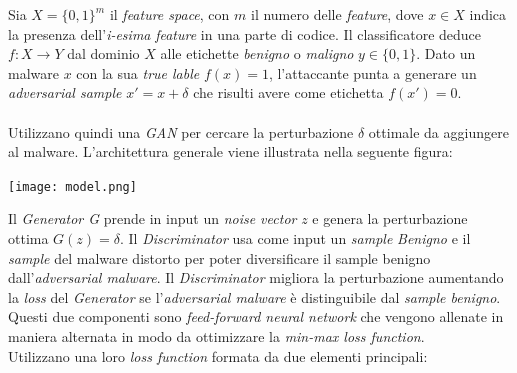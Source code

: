 Sia \(X = \{0, 1\}^m\) il \textit{feature space}, con \(m\) il numero delle \textit{feature}, dove \(x \in X\) indica la presenza dell'\textit{i-esima} \textit{feature} in una parte di codice. Il classificatore deduce \(f : X \to Y\) dal dominio \(X\) alle etichette \textit{benigno} o \textit{maligno} \(y \in \{0, 1\}\). Dato un malware \(x\) con la sua \textit{true lable} \(f(x) = 1\), l'attaccante punta a generare un \textit{adversarial sample} \(x' = x + \delta\) che risulti avere come etichetta \(f(x') = 0\).\\
\\
Utilizzano quindi una \textit{GAN} per cercare la perturbazione \(\delta\) ottimale da aggiungere al malware. L'architettura generale viene illustrata nella seguente figura:

\texttt{[image: model.png]}

Il \textit{Generator G} prende in input un \textit{noise vector} \(z\) e genera la perturbazione ottima \(G(z) = \delta\).
Il \textit{Discriminator} usa come input un \textit{sample} \textit{Benigno} e il \textit{sample} del malware distorto per poter diversificare il sample benigno dall'\textit{adversarial malware}. Il \textit{Discriminator} migliora la perturbazione aumentando la \textit{loss} del \textit{Generator} se l'\textit{adversarial malware} è distinguibile dal \textit{sample benigno}.\\
Questi due componenti sono \textit{feed-forward neural network} che vengono allenate in maniera alternata in modo da ottimizzare la \textit{min-max loss function}.\\
Utilizzano una loro \textit{loss function} formata da due elementi principali:

